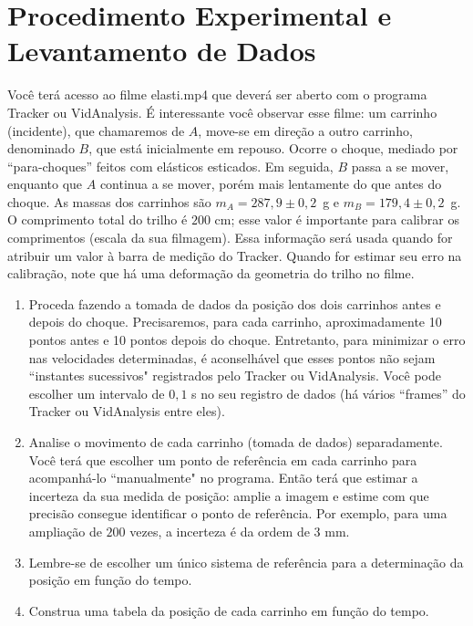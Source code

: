 \vspace{-0.3cm}
\section{Procedimento Experimental e Levantamento de Dados}
Você terá acesso ao filme elasti.mp4 que deverá ser aberto com o programa Tracker ou VidAnalysis.
É interessante você observar esse filme: um carrinho (incidente), que chamaremos de $A$, move-se em direção a outro carrinho, denominado $B$, que está inicialmente em repouso. Ocorre o choque, mediado por ``para-choques''  feitos com elásticos esticados. Em seguida, $B$ passa a se mover, enquanto que $A$ continua a se mover, porém mais lentamente do que antes do choque. As massas dos carrinhos são $m_{A}=287,9 \pm 0,2$~g e $m_{B}=179,4 \pm 0,2$~g.
O comprimento total do trilho é $200$ cm; esse valor é importante para calibrar os comprimentos (escala da sua filmagem). Essa informação será usada quando for atribuir um valor à barra de medição do Tracker. Quando for estimar seu erro na calibração, note que há uma deformação da geometria do trilho no filme.

\begin{enumerate}
\item Proceda fazendo a tomada de dados da posição dos dois carrinhos antes e depois do choque. Precisaremos, para cada carrinho, aproximadamente 10 pontos antes e 10 pontos depois do choque. Entretanto, para minimizar o erro nas velocidades determinadas, é aconselhável que esses pontos não sejam “instantes sucessivos" registrados pelo Tracker ou VidAnalysis. 
Você pode escolher um intervalo de $0,1$ s no seu registro de dados (há vários ``frames''  do Tracker
ou VidAnalysis entre eles). 
\item  Analise o movimento de cada carrinho (tomada de dados) separadamente. Você terá que escolher um ponto de referência em cada carrinho para acompanhá-lo “manualmente" no programa.
Então terá que estimar a incerteza da sua medida de posição: amplie a imagem
e estime com que precisão consegue identificar o ponto de referência. Por exemplo, para uma ampliação de $200$ vezes, a incerteza é da ordem de $3$ mm.
\item Lembre-se de escolher um único sistema de referência para a determinação da posição em função do tempo. 
\item Construa uma tabela da posição de cada carrinho em função do tempo. 
\end{enumerate}

